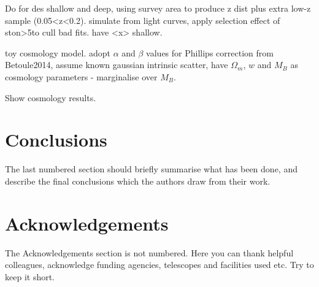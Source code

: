 \documentclass[a4paper,fleqn,usenatbib]{mnras}
\begin{document}
Do for des shallow and deep, using survey area to produce z dist plus extra low-z sample (0.05<z<0.2). simulate from light curves, apply selection effect of ston>5to cull bad fits. have <x> shallow.

toy cosmology model. adopt $\alpha$ and $\beta$ values for Phillips correction from Betoule2014, assume known gaussian intrinsic scatter, have $\Omega_m$, $w$ and $M_B$ as cosmology parameters - marginalise over $M_B$.

Show cosmology results.


%

\section{Conclusions}

The last numbered section should briefly summarise what has been done, and describe
the final conclusions which the authors draw from their work.

\section*{Acknowledgements}

The Acknowledgements section is not numbered. Here you can thank helpful
colleagues, acknowledge funding agencies, telescopes and facilities used etc.
Try to keep it short.
\end{document}
